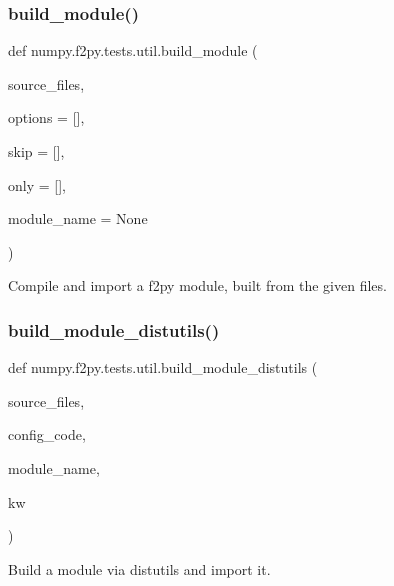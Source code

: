 \subsubsection{\texorpdfstring{build\+\_\+module()}{build\_module()}}
{\footnotesize\ttfamily def numpy.\+f2py.\+tests.\+util.\+build\+\_\+module (\begin{DoxyParamCaption}\item[{}]{source\+\_\+files,  }\item[{}]{options = {\ttfamily \mbox{[}\mbox{]}},  }\item[{}]{skip = {\ttfamily \mbox{[}\mbox{]}},  }\item[{}]{only = {\ttfamily \mbox{[}\mbox{]}},  }\item[{}]{module\+\_\+name = {\ttfamily None} }\end{DoxyParamCaption})}

\begin{DoxyVerb}Compile and import a f2py module, built from the given files.\end{DoxyVerb}
 \mbox{\label{namespacenumpy_1_1f2py_1_1tests_1_1util_ab957065f9d5eb6a698620a5221ef19e9}} 
\subsubsection{\texorpdfstring{build\+\_\+module\+\_\+distutils()}{build\_module\_distutils()}}
{\footnotesize\ttfamily def numpy.\+f2py.\+tests.\+util.\+build\+\_\+module\+\_\+distutils (\begin{DoxyParamCaption}\item[{}]{source\+\_\+files,  }\item[{}]{config\+\_\+code,  }\item[{}]{module\+\_\+name,  }\item[{}]{kw }\end{DoxyParamCaption})}

\begin{DoxyVerb}Build a module via distutils and import it.\end{DoxyVerb}
 \mbox{\label{namespacenumpy_1_1f2py_1_1tests_1_1util_ae8d1eca29ae0f38513d5cd0d8410a4d4}} 
